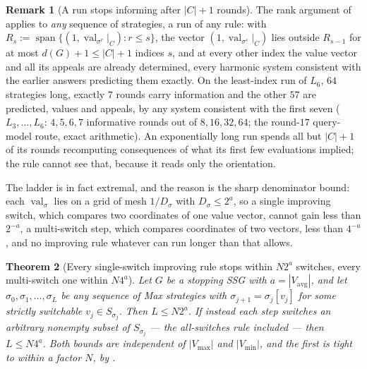 \documentclass[11pt]{article}
\theoremstyle{plain}
\newtheorem{theorem}{Theorem}[section]
\theoremstyle{definition}
\newtheorem{remark}[theorem]{Remark}
\DeclareMathOperator{\val}{val}
\newcommand{\Vmax}{V_{\max}}
\newcommand{\Vmin}{V_{\min}}
\newcommand{\Vavg}{V_{\mathrm{avg}}}
\begin{document}
\begin{remark}[A run stops informing after $|C|+1$ rounds]\label{rem:run-informs}
The rank argument of  applies to \emph{any}
sequence of strategies, a run of any rule: with
$R_s:=\operatorname{span}\{(1,\val_{\sigma^{r}}|_C):r\le s\}$, the vector
$(1,\val_{\sigma^{s}}|_C)$ lies outside $R_{s-1}$ for at most $d(G)+1\le|C|+1$
indices $s$, and at every other index the value vector and all its
appeals are already determined, every harmonic system consistent with the
earlier answers predicting them exactly. On the least-index run of $L_6$,
$64$ strategies long, exactly $7$ rounds carry information and the other
$57$ are predicted, values and appeals, by any system consistent with the
first seven ($L_3,\dots,L_6$: $4,5,6,7$ informative rounds out of
$8,16,32,64$; the round-$17$ query-model route, exact arithmetic). An
exponentially long run spends all but $|C|+1$ of its rounds recomputing
consequences of what its first few evaluations implied; the rule cannot
see that, because it reads only the orientation.
\end{remark}

The ladder is in fact extremal, and the reason is the sharp denominator
bound: each $\val_\sigma$ lies on a grid of mesh $1/D_\sigma$ with
$D_\sigma\le2^{a}$, so a single improving switch, which compares two
coordinates of one value vector, cannot gain less than $2^{-a}$, a
multi-switch step, which compares coordinates of two vectors, less than
$4^{-a}$, and no improving rule whatever can run longer than that allows.

\begin{theorem}[Every single-switch improving rule stops within $N2^{a}$ switches, every multi-switch one within $N4^{a}$]\label{thm:switch-count}
Let $G$ be a stopping SSG with $a=|\Vavg|$, and let
$\sigma_0,\sigma_1,\dots,\sigma_L$ be any sequence of Max strategies with
$\sigma_{j+1}=\sigma_j[v_j]$ for some strictly switchable $v_j\in
S_{\sigma_j}$. Then $L\le N2^{a}$. If instead each step switches an
arbitrary nonempty subset of $S_{\sigma_j}$ --- the all-switches rule
included --- then $L\le N4^{a}$. Both bounds are independent of
$|\Vmax|$ and $|\Vmin|$, and the first is tight to within a factor $N$,
by .
\end{theorem}
\end{document}
